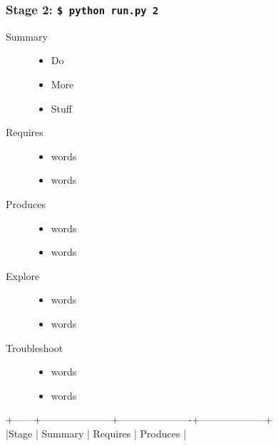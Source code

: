\documentclass[twoside,a4paper]{refart}
\begin{document}
\subsubsection{\textbf{Stage 2:} \texttt{\$ python run.py 2}}
  \begin{description}
    \item [Summary]
      \begin{itemize}
        \item
          Do
        \item
          More
        \item
          Stuff
\\
      \end{itemize}
    \item [Requires]
      \begin{itemize}
        \item
          words
        \item
          words
\\
      \end{itemize}
  
  
    \item [Produces]
      \begin{itemize}
        \item
          words
        \item
          words
\\
      \end{itemize}
      
    \item [Explore]
      \begin{itemize}
        \item
          words
        \item
          words
\\
      \end{itemize}

    \item [Troubleshoot]
      \begin{itemize}
        \item
          words
        \item
          words
\\
      \end{itemize}
  \end{description}
\newpage
 +------+---------------------+----------------------+--------------------+\\
    |Stage | Summary             | Requires             | Produces           |\\
\end{document}
